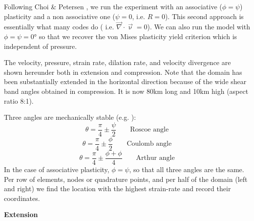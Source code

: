 Following Choi \& Petersen \cite{chpe15}, we run the experiment with an associative ($\phi=\psi$) plasticity
and a non associative one ($\psi=0$, i.e. $R=0$). This second approach is essentially what many codes do (
i.e. $\vec\nabla\cdot\vec\upnu = 0$). We can also run the model with $\phi=\psi=0\si{\degree}$ so that 
we recover the von Mises plasticity yield criterion which is independent of pressure.  

The velocity, pressure, strain rate, dilation rate, and velocity divergence are shown hereunder both in 
extension and compression. Note that the domain has been substantially extended in the horizontal 
direction because of the wide shear band angles obtained in compression. It is now 80\si{\km} long 
and 10\si{\km} high (aspect ratio 8:1). 

Three angles are mechanically stable (e.g. \cite{kaus10}):
\[
\theta=\frac{\pi}{4}\pm \frac{\psi}{2} \qquad \text{Roscoe angle}
\]
\[
\theta=\frac{\pi}{4}\pm \frac{\phi}{2} \qquad \text{Coulomb angle}
\]
\[
\theta=\frac{\pi}{4}\pm \frac{\phi+\phi}{4} \qquad \text{Arthur angle}
\]
In the case of associative plasticity, $\phi=\psi$, so that all three angles are the same. 
Per row of elements, nodes or quadrature points, and per half of the domain (left and right) we find the location
with the highest strain-rate and record their coordinates.


\newpage
{\bf Extension}

